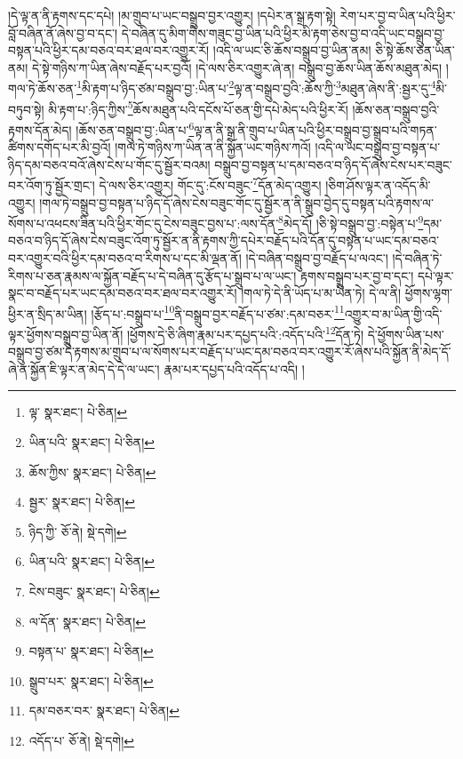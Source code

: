 །དེ་ལྟ་ན་ནི་རྟགས་དང་དཔེ། །མ་གྲུབ་པ་ཡང་བསྒྲུབ་བྱར་འགྱུར། །དཔེར་ན་སྒྲ་རྟག་སྟེ། རེག་པར་བྱ་བ་ཡིན་པའི་ཕྱིར་བློ་བཞིན་ནོ་ཞེས་བྱ་བ་དང་། དེ་བཞིན་དུ་མིག་གིས་གཟུང་བྱ་ཡིན་པའི་ཕྱིར་མི་རྟག་ཅེས་བྱ་བ་འདི་ཡང་བསྒྲུབ་བྱ་བསྟན་པའི་ཕྱིར་དམ་བཅའ་བར་ཐལ་བར་འགྱུར་རོ། །འདི་ལ་ཡང་ཅི་ཆོས་བསྒྲུབ་བྱ་ཡིན་ནམ། ཅི་སྟེ་ཆོས་ཅན་ཡིན་ནམ། དེ་སྟེ་གཉིས་ཀ་ཡིན་ཞེས་བརྗོད་པར་བྱའོ། །དེ་ལས་ཅིར་འགྱུར་ཞེ་ན། བསྒྲུབ་བྱ་ཆོས་ཡིན་ཆོས་མཐུན་མེད། །གལ་ཏེ་ཆོས་ཅན་\footnote{ལྟ་  སྣར་ཐང་།  པེ་ཅིན། }མི་རྟག་པ་ཉིད་ཙམ་བསྒྲུབ་བྱ་:ཡིན་པ་\footnote{ཡིན་པའི་  སྣར་ཐང་།  པེ་ཅིན། }ལྟ་ན་བསྒྲུབ་བྱའི་:ཆོས་ཀྱི་\footnote{ཆོས་ཀྱིས་  སྣར་ཐང་།  པེ་ཅིན། }མཐུན་ཞེས་ནི་:སྦྱར་དུ་\footnote{སྦྱར་  སྣར་ཐང་།  པེ་ཅིན། }མི་བཏུབ་སྟེ། མི་རྟག་པ་:ཉིད་ཀྱིས་\footnote{ཉིད་ཀྱི་  ཅོ་ནེ།  སྡེ་དགེ། }ཆོས་མཐུན་པའི་དངོས་པོ་ཅན་གྱི་དཔེ་མེད་པའི་ཕྱིར་རོ། །ཆོས་ཅན་བསྒྲུབ་བྱའི་རྟགས་དོན་མེད། །ཆོས་ཅན་བསྒྲུབ་བྱ་:ཡིན་པ་\footnote{ཡིན་པའི་  སྣར་ཐང་།  པེ་ཅིན། }ལྟ་ན་ནི་སྒྲ་ནི་གྲུབ་པ་ཡིན་པའི་ཕྱིར་བསྒྲུབ་བྱ་སྒྲུབ་པའི་གཏན་ཚིགས་དགོད་པར་མི་བྱའོ། །གལ་ཏེ་གཉིས་ཀ་ཡིན་ན་ནི་སྐྱོན་ཡང་གཉིས་ཀའོ། །འདི་ལ་ཡང་བསྒྲུབ་བྱ་བསྟན་པ་ཉིད་དམ་བཅའ་བའོ་ཞེས་ངེས་པ་གོང་དུ་སྦྱོར་བའམ། བསྒྲུབ་བྱ་བསྟན་པ་དམ་བཅའ་བ་ཉིད་དོ་ཞེས་ངེས་པར་བཟུང་བར་འོག་ཏུ་སྦྱོར་གྲང་། དེ་ལས་ཅིར་འགྱུར། གོང་དུ་:ངོས་བཟུང་\footnote{ངེས་བཟུང་  སྣར་ཐང་།  པེ་ཅིན། }དོན་མེད་འགྱུར། །ཅིག་ཤོས་ལྟར་ན་འདོད་མི་འགྱུར། །གལ་ཏེ་བསྒྲུབ་བྱ་བསྟན་པ་ཉིད་དོ་ཞེས་ངེས་བཟུང་གོང་དུ་སྦྱོར་ན་ནི་སྒྲུབ་བྱེད་དུ་བསྟན་པའི་རྟགས་ལ་སོགས་པ་འཕངས་ཟིན་པའི་ཕྱིར་གོང་དུ་ངེས་བཟུང་བྱས་པ་:ལས་དོན་\footnote{ལ་དོན་  སྣར་ཐང་།  པེ་ཅིན། }མེད་དོ། །ཅི་སྟེ་བསྒྲུབ་བྱ་:བསྟེན་པ་\footnote{བསྟན་པ་  སྣར་ཐང་།  པེ་ཅིན། }དམ་བཅའ་བ་ཉིད་དོ་ཞེས་ངེས་བཟུང་འོག་ཏུ་སྦྱོར་ན་ནི་རྟགས་ཀྱི་དཔེར་བརྗོད་པའི་དོན་དུ་བསྟན་པ་ཡང་དམ་བཅའ་བར་འགྱུར་བའི་ཕྱིར་དམ་བཅའ་བ་རིགས་པ་དང་མི་ལྡན་ནོ། །དེ་བཞིན་བསྒྲུབ་བྱ་བརྗོད་པ་ལའང་། །དེ་བཞིན་ཏེ་རིགས་པ་ཅན་རྣམས་ལ་སྐྱོན་བརྗོད་པ་དེ་བཞིན་དུ་རྩོད་པ་སྒྲུབ་པ་ལ་ཡང་། རྟགས་བསྒྲུབ་པར་བྱ་བ་དང་། དཔེ་ལྟར་སྣང་བ་བརྗོད་པར་ཡང་དམ་བཅའ་བར་ཐལ་བར་འགྱུར་རོ། །གལ་ཏེ་དེ་ནི་ཡོད་པ་མ་ཡིན་ཏེ། དེ་ལ་ནི། ཕྱོགས་ལྷག་ཕྱིར་ན་སྲིད་མ་ཡིན། །རྩོད་པ་:བསྒྲུབ་པ་\footnote{སྒྲུབ་པར་  སྣར་ཐང་།  པེ་ཅིན། }ནི་བསྒྲུབ་བྱར་བརྗོད་པ་ཙམ་:དམ་བཅར་\footnote{དམ་བཅར་བར་  སྣར་ཐང་།  པེ་ཅིན། }འགྱུར་བ་མ་ཡིན་གྱི་འདི་ལྟར་ཕྱོགས་བསྒྲུབ་བྱ་ཡིན་ནོ། །ཕྱོགས་དེ་ཅི་ཞིག་རྣམ་པར་དཔྱད་པའི་:འདོད་པའི་\footnote{འདོད་པ་  ཅོ་ནེ།  སྡེ་དགེ། }དོན་ཏེ། དེ་ཕྱོགས་ཡིན་པས་བསྒྲུབ་བྱ་ཙམ་དེ་རྟགས་མ་གྲུབ་པ་ལ་སོགས་པར་བརྗོད་པ་ཡང་དམ་བཅའ་བར་འགྱུར་རོ་ཞེས་པའི་སྐྱོན་ནི་མེད་དོ་ཞེ་ན་སྐྱོན་ཇི་ལྟར་ན་མེད་དེ་དེ་ལ་ཡང་། རྣམ་པར་དཔྱད་པའི་འདོད་པ་འདི། །
